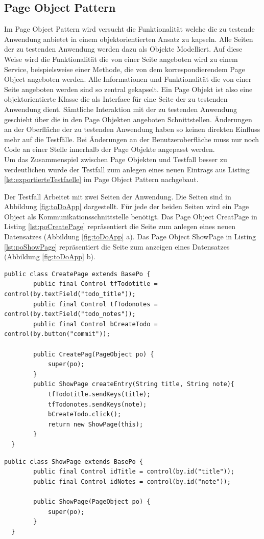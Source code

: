 \subsection{Page Object Pattern}
\label{sec:page_object_pattern}
Im Page Object Pattern wird versucht die Funktionalität welche die zu testende Anwendung anbietet in einem objektorientierten Ansatz zu kapseln.
Alle Seiten der zu testenden Anwendung werden dazu als Objekte Modelliert. Auf diese Weise wird die Funktionalität die von einer Seite angeboten wird zu einem Service, beispielsweise einer Methode, die von dem korrespondierendem Page Object angeboten werden.
Alle Informationen und Funktionalität die von einer Seite angeboten werden sind so zentral gekapselt.
Ein Page Objekt ist also eine objektorientierte Klasse die als Interface für eine Seite der zu testenden Anwendung dient.
Sämtliche Interaktion mit der zu testenden Anwendung geschieht über die in den Page Objekten angeboten Schnittstellen.
Änderungen an der Oberfläche der zu testenden Anwendung haben so keinen direkten Einfluss mehr auf die Testfälle. Bei Änderungen an der Benutzeroberfläche muss nur noch Code an einer Stelle innerhalb der Page Objekte angepasst werden.\\
Um das Zusammenspiel zwischen Page Objekten und Testfall besser zu verdeutlichen wurde der Testfall zum anlegen eines neuen Eintrags aus Listing \ref{lst:exportierteTestfaelle} im Page Object Pattern nachgebaut.

Der Testfall Arbeitet mit zwei Seiten der Anwendung. Die Seiten sind in Abbildung \ref{fig:toDoApp} dargestellt. Für jede der beiden Seiten wird ein Page Object als Kommunikationsschnittstelle benötigt. 
Das Page Object CreatPage in Listing \ref{lst:poCreatePage} repräsentiert die Seite zum anlegen eines neuen Datensatzes (Abbildung \ref{fig:toDoApp} a). Das Page Object ShowPage in Listing \ref{lst:poShowPage} repräsentiert die Seite zum anzeigen eines Datensatzes (Abbildung \ref{fig:toDoApp} b).

\begin{lstlisting}[caption={Page Object CreatePage},label={lst:poCreatePage}]
  public class CreatePage extends BasePo {
		public final Control tfTodotitle = control(by.textField("todo_title"));
		public final Control tfTodonotes = control(by.textField("todo_notes"));
		public final Control bCreateTodo = control(by.button("commit"));

		public CreatePag(PageObject po) {
			super(po);
		}
		public ShowPage createEntry(String title, String note){
			tfTodotitle.sendKeys(title);
			tfTodonotes.sendKeys(note);
			bCreateTodo.click();
			return new ShowPage(this);
		}
  }
\end{lstlisting}  
\begin{lstlisting}[caption={Page Object ShowPage},label={lst:poShowPage}]  
  public class ShowPage extends BasePo {
		public final Control idTitle = control(by.id("title"));
		public final Control idNotes = control(by.id("note"));

		public ShowPage(PageObject po) {
			super(po);
		}
  }
\end{lstlisting}

